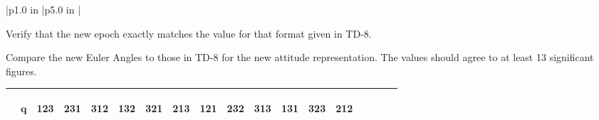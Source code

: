 \begin{table}[htbp!]
\begin{tabular}{|p{1.0 in} |p{5.0 in} |}
\begin{compactenum}
             \item Verify that the new epoch exactly matches the value for that format given in TD-8.
             \item Compare the new Euler Angles to those in TD-8 for the new attitude representation.  The values should agree to at least 13 significant figures.
          \end{compactenum}
          \vspace{.1 in}
          \begin{centering} \footnotesize
          \begin{tabular}{|l|c|c|c|c|c|c|c|c|c|c|c|c|c|c|c|c|c|}
          \hline
             & {\begin{sideways}\parbox{1.0cm}{$\mathbf{q}$}\end{sideways}} &
             {\begin{sideways}\parbox{1.0cm}{123}\end{sideways}} &
             {\begin{sideways}\parbox{1.0cm}{231}\end{sideways}} &
             {\begin{sideways}\parbox{1.0cm}{312}\end{sideways}} &
             {\begin{sideways}\parbox{1.0cm}{132}\end{sideways}}  &
             {\begin{sideways}\parbox{1.0cm}{321}\end{sideways}}  &
             {\begin{sideways}\parbox{1.0cm}{213}\end{sideways}}  &
             {\begin{sideways}\parbox{1.0cm}{121}\end{sideways}} &
             {\begin{sideways}\parbox{1.0cm}{232}\end{sideways}} &
             {\begin{sideways}\parbox{1.0cm}{313}\end{sideways}} &
             {\begin{sideways}\parbox{1.0cm}{131}\end{sideways}} &
             {\begin{sideways}\parbox{1.0cm}{323}\end{sideways}} &
             {\begin{sideways}\parbox{1.0cm}{212}\end{sideways}}  \\ \hline

\end{tabular}
\end{centering}
\end{tabular}
\end{table}

